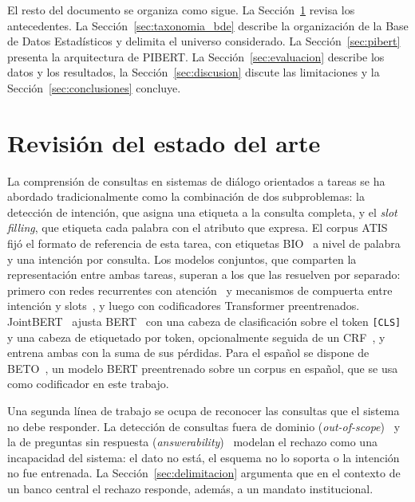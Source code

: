 \documentclass[11pt]{article}
\begin{document}
El resto del documento se organiza como sigue. La Sección~\ref{sec:estado-del-arte}
revisa los antecedentes. La Sección~\ref{sec:taxonomia_bde} describe la
organización de la Base de Datos Estadísticos y delimita el universo considerado.
La Sección~\ref{sec:pibert} presenta la arquitectura de PIBERT. La
Sección~\ref{sec:evaluacion} describe los datos y los resultados, la
Sección~\ref{sec:discusion} discute las limitaciones y la
Sección~\ref{sec:conclusiones} concluye.

\section{Revisión del estado del arte}
\label{sec:estado-del-arte}

La comprensión de consultas en sistemas de diálogo orientados a tareas se ha
abordado tradicionalmente como la combinación de dos subproblemas: la detección de
intención, que asigna una etiqueta a la consulta completa, y el \textit{slot
filling}, que etiqueta cada palabra con el atributo que expresa. El corpus
ATIS~\citep{hemphill1990atis} fijó el formato de referencia de esta tarea, con
etiquetas BIO~\citep{ramshaw1995text} a nivel de palabra y una intención por
consulta. Los modelos conjuntos, que comparten la representación entre ambas
tareas, superan a los que las resuelven por separado: primero con redes
recurrentes con atención~\citep{liu2016attention} y mecanismos de compuerta entre
intención y slots~\citep{goo2018slot}, y luego con codificadores Transformer
preentrenados. JointBERT~\citep{chen2019bert} ajusta BERT~\citep{devlin2019bert}
con una cabeza de clasificación sobre el token \texttt{[CLS]} y una cabeza de
etiquetado por token, opcionalmente seguida de un CRF~\citep{lafferty2001conditional},
y entrena ambas con la suma de sus pérdidas. Para el español se dispone de
BETO~\citep{canete2020spanish}, un modelo BERT preentrenado sobre un corpus en
español, que se usa como codificador en este trabajo.

Una segunda línea de trabajo se ocupa de reconocer las consultas que el sistema no
debe responder. La detección de consultas fuera de dominio
(\textit{out-of-scope})~\citep{larson2019evaluation} y la de preguntas sin
respuesta (\textit{answerability})~\citep{rajpurkar2018know} modelan el rechazo
como una incapacidad del sistema: el dato no está, el esquema no lo soporta o la
intención no fue entrenada. La Sección~\ref{sec:delimitacion} argumenta que en el
contexto de un banco central el rechazo responde, además, a un mandato
institucional.
\end{document}
